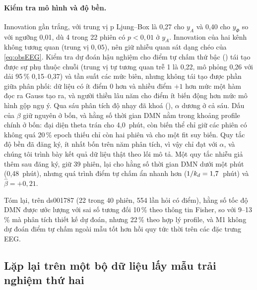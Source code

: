 \paragraph{Kiểm tra mô hình và độ bền.} Innovation gần trắng, với trung vị p Ljung--Box \citep{Ljung1978} là 0,27 cho $y_A$ và 0,40 cho $y_\Phi$ so với ngưỡng 0,01, dù 4 trong 22 phiên có $p<0{,}01$ ở $y_A$. Innovation của hai kênh không tương quan (trung vị $0{,}05$), nên giữ nhiễu quan sát dạng chéo của \eqref{eq:obsEEG}. Kiểm tra dự đoán hậu nghiệm cho điểm tự chấm thứ bậc () tái tạo được sự phụ thuộc chuỗi (trung vị tự tương quan trễ 1 là 0,22, mô phỏng 0,26 với dải 95\,\% 0,15--0,37) và tần suất các mức biên, nhưng không tái tạo được phần giữa phân phối: dữ liệu có ít điểm 0 hơn và nhiều điểm $+1$ hơn mức một hàm đọc ra Gauss tạo ra, và người thiền lâu năm cho điểm ít biến động hơn mức mô hình gộp ngụ ý. Qua sáu phân tích độ nhạy đã khoá (), $\alpha$ dương ở cả sáu. Dấu của $\beta$ giữ nguyên ở bốn, và hằng số thời gian DMN nằm trong khoảng profile chính ở bốn: đại diện theta trán cho 4,0~phút, còn biến thể chỉ giữ các phiên có không quá 20\,\% epoch thiếu chỉ còn hai phiên và cho một fit suy biến. Quy tắc độ bền đã đăng ký, ít nhất bốn trên năm phân tích, vì vậy chỉ đạt với $\alpha$, và chúng tôi trình bày kết quả dữ liệu thật theo lối mô tả. Một quy tắc nhiễu giả thêm sau đăng ký, giữ 39 phiên, lại cho hằng số thời gian DMN dưới một phút (0,48~phút), nhưng quá trình điểm tự chấm ẩn nhanh hơn ($1/k_{d}=1{,}7$~phút) và $\hat\beta=+0{,}21$.

Tóm lại, trên ds001787 (22 trong 40 phiên, 554 lần hỏi có điểm), hằng số tốc độ DMN được ước lượng với sai số tương đối 10\,\% theo thông tin Fisher, so với 9--13\,\% mà phân tích thiết kế dự đoán, nhưng 22\,\% theo hợp lý profile, và M1 không dự đoán điểm tự chấm ngoài mẫu tốt hơn hồi quy tức thời trên các đặc trưng EEG.

\subsection{Lặp lại trên một bộ dữ liệu lấy mẫu trải nghiệm thứ hai}
\label{sec:res-osf}


